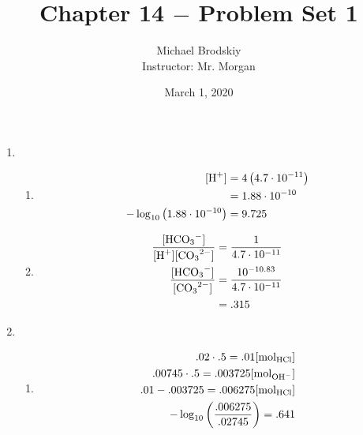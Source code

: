 \documentclass[12pt]{article}
\title{Chapter 14 $-$ Problem Set 1}
\date{March 1, 2020}
\author{Michael Brodskiy\\ \small Instructor: Mr. Morgan}
\begin{document}
\maketitle

\begin{enumerate}

  \item

    \begin{enumerate}

      \item 

        \begin{equation}
          \begin{split}
            [\ce{H+}]&=4\left( 4.7\cdot10^{-11} \right)\\
            &=1.88\cdot10^{-10}\\
            -\log_{10}\left( 1.88\cdot10^{-10} \right)&=9.725
        \end{split}
          \label{1}
        \end{equation}

      \item

        \begin{equation}
          \begin{split}
            \frac{[\ce{HCO3-}]}{[\ce{H+}][\ce{CO3^2-}]}&=\frac{1}{4.7\cdot10^{-11}}\\
            \frac{[\ce{HCO3-}]}{[\ce{CO3^2-}]}&=\frac{10^{-10.83}}{4.7\cdot10^{-11}}\\
            &=.315
        \end{split}
          \label{2}
        \end{equation}

    \end{enumerate}

  \item {}

    \begin{enumerate}

      \item 

        \begin{equation}
          \begin{split}
            .02\cdot.5=.01[\si{\mole_{\ce{HCl}}}]\\
          .00745\cdot.5=.003725[\si{\mole}_{\ce{OH-}}]\\
            .01-.003725=.006275[\si{\mole}_{\ce{HCl}}]\\
            -\log_{10}\left( \frac{.006275}{.02745} \right)=.641
          \end{split}
          \label{3}
        \end{equation}


\end{enumerate}
\end{enumerate}
\end{document}
